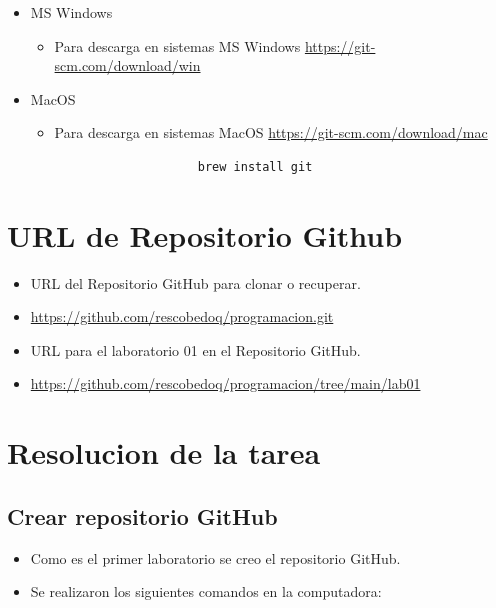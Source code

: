 \documentclass{article}
\begin{document}
\begin{itemize}
\begin{itemize}
\begin{itemize}
\begin{lstlisting}
                \end{lstlisting}
            \end{itemize}
            \item MS Windows
            \begin{itemize}
                \item Para descarga en sistemas MS Windows \url{https://git-scm.com/download/win}
            \end{itemize}
            \item MacOS
            \begin{itemize}
                \item Para descarga en sistemas MacOS \url{https://git-scm.com/download/mac}
                \begin{verbatim}
                    brew install git
                \end{verbatim}
            \end{itemize}
        \end{itemize}
	\end{itemize}
	
	\section{URL de Repositorio Github}
	\begin{itemize}
		\item URL del Repositorio GitHub para clonar o recuperar.
		\item \url{https://github.com/rescobedoq/programacion.git}
		\item URL para el laboratorio 01 en el Repositorio GitHub.
		\item \url{https://github.com/rescobedoq/programacion/tree/main/lab01}
	\end{itemize}
	
	\section{Resolucion de la tarea}
	
	\subsection{Crear repositorio GitHub}
	\begin{itemize}	
		\item Como es el primer laboratorio se creo el repositorio GitHub.
		\item Se realizaron los siguientes comandos en la computadora:
	\end{itemize}	
		
\end{document}
